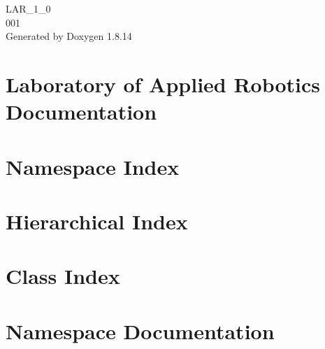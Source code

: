 \documentclass[twoside]{book}
\newcommand{\+}{\discretionary{\mbox{\scriptsize$\hookleftarrow$}}{}{}}
\newcommand{\clearemptydoublepage}{%
  \newpage{\pagestyle{empty}\cleardoublepage}%
}
\begin{document}
\hypersetup{pageanchor=false,
             bookmarksnumbered=true,
             pdfencoding=unicode
            }
\begin{titlepage}
\vspace*{7cm}
\begin{center}%
{\Large L\+A\+R\+\_\+1\+\_\+0 \\[1ex]\large 001 }\\
\vspace*{1cm}
{\large Generated by Doxygen 1.8.14}\\
\end{center}
\end{titlepage}
\clearemptydoublepage
{}
\tableofcontents
\clearemptydoublepage
{}
\hypersetup{pageanchor=true}

\chapter{Laboratory of Applied Robotics Documentation}
\label{index}\hypertarget{index}{}
\chapter{Namespace Index}

\chapter{Hierarchical Index}

\chapter{Class Index}

\chapter{Namespace Documentation}





\end{document}
